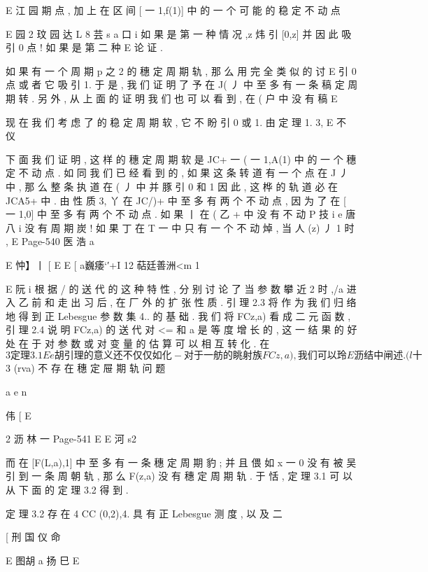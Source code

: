 {{E 江 园
期 点 , 加 上 在 区 间 [ 一 1,f(1)] 中 的 一 个 可 能 的 稳 定 不 动 点

E 园 2
玟
园 达 L 8 芸 s
a 口 i
如 果 是 第 一 种 情 况 ,z 炜 引 [0,z] 并 因 此 吸 引 0 点 ! 如 果 是 第 二 种
E
论 证 .

如 果 有 一 个 周 期 p 之 2 的 穗 定 周 期 轨 , 那 么 用 完 全 类 似 的 讨
E
引 0 点 或 者 它 吸 引 1. 于 是 , 我 们 证 明 了 予 在 J( 丿 中 至 多 有 一 条 稿
定 周 期 转 . 另 外 , 从 上 面 的 证 明 我 们 也 可 以 看 到 , 在 ( 户 中 没 有 稿
E

现 在 我 们 考 虑 了 的 稳 定 周 期 软 , 它 不 盼 引 0 或 1. 由 定 理 1. 3,
E 不 仪

下 面 我 们 证 明 , 这 样 的 穗 定 周 期 软 是 JC+ 一 ( 一 1,A(1) 中
的 一 个 穗 定 不 动 点 . 如 同 我 们 已 经 看 到 的 , 如 果 这 条 转 道 有 一 个 点
在 J 丿 中 , 那 么 整 条 执 道 在 ( 丿 中 并 豚 引 0 和 1 因 此 , 这 桦 的 轨
道 必 在 JCA5+ 中 . 由 性 质 3, 丫 在 JC/)+ 中 至 多 有 两 个 不 动 点 , 因 为
了 在 [ 一 1,0] 中 至 多 有 两 个 不 动 点 . 如 果 丨 在 ( 乙 + 中 没 有 不 动
P 技 i e 唐 八 i
没 有 周 期 炭 ! 如 果 丁 在 T 一 中 只 有 一 个 不 动 焯 , 当 人 (z) 丿 1 时 ,
E
Page-540
医 浩 a

E 忡】丨
[
E
E
[
a巍痿`′+I 12
萜廷善洲<m 1

E
阮
i
根 据 / 的 送 代 的 这 种 特 性 , 分 别 讨 论 了 当 参 数 攀 近 2 时 ,/a 进 入
乙 前 和 走 出 习 后 , 在 厂 外 的 扩 张 性 质 . 引 理 2.3 将 作 为 我 们 归 络
地 得 到 正 Lebesgue 参 数 集 4.. 的 基 础 . 我 们 将 FCz,a) 看 成 二 元 函
数 , 引 理 2.4 说 明 FCz,a) 的 送 代 对 <= 和 a 是 等 度 增 长 的 , 这 一 结 果
的 好 处 在 于 对 参 数 或 对 变 量 的 估 算 可 以 相 互 转 化 . 在 $ 3 定 理 3.1
E e 胡
引 理 的 意 义 还 不 仅 仅 如 化 - 对 于 一 舫 的 眺 射 族 FCz,a), 我 们 可 以
玲
E 沥
结 中 闸 述 .

(l十

$ 3 (rva) 不 存 在 穗 定 屉 期 轨 问 题

a
e
n

伟 [
E

2 沥 林 一
Page-541
E E 河 s2

而 在 [F(L,a),1] 中 至 多 有 一 条 穗 定 周 期 豹 ; 并 且 偎 如 x 一 0 没 有
被 吴 引 到 一 条 周 朝 轨 , 那 么 F(z,a) 没 有 穗 定 周 期 轨 . 于 恬 , 定 理
3.1 可 以 从 下 面 的 定 理 3.2 得 到 .

定 理 3.2 存 在 4 CC (0,2),4. 具 有 正 Lebesgue 测 度 , 以 及
二

[ 刑 国 仪 命

E 图胡 a 扬 巳
E

}}
